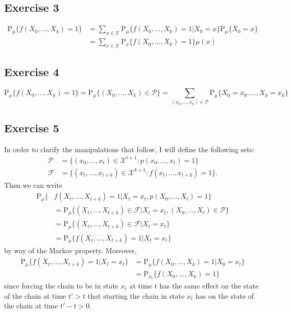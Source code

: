 \documentclass[12pt]{article}
\newcommand{\Prob}{\mathrm{P}}
\begin{document}
\subsection*{Exercise 3}

\begin{align*}
\Prob_\mu \{f(X_0, \ldots, X_k) = 1\} &= \sum_{x \in \mathcal{X}} \Prob_\mu \{f(X_0, \ldots, X_k) = 1 | X_0 = x\} \Prob_\mu \{X_0 = x\} \\
&= \sum_{x \in \mathcal{X}} \Prob_x \{f(X_0, \ldots, X_k) = 1\} \mu(x)
\end{align*}

\subsection*{Exercise 4}

\begin{equation*}
\Prob_\mu \{f(X_0, \ldots, X_k) = 1\} = \Prob_\mu \{(X_0, \ldots, X_k) \in \mathcal{P}\} = \sum_{(x_0, \ldots, x_k) \in \mathcal{P}} \Prob_\mu \{X_0 = x_0, \ldots, X_k = x_k\}
\end{equation*}

\subsection*{Exercise 5}

In order to clarify the manipulations that follow, I will define the following sets:
\begin{align*}
\mathcal{P} &= \{(x_0, \ldots, x_t) \in \mathcal{X}^{t+1} : p(x_0, \ldots, x_t) = 1\} \\
\mathcal{F} &= \{(x_t, \ldots, x_{t+k}) \in \mathcal{X}^{k+1} : f(x_t, \ldots, x_{t+k}) = 1\}.
\end{align*}
Then we can write
\begin{align*}
\Prob_\mu \{&f(X_t, \ldots, X_{t+k}) = 1 | X_t = x_t, p(X_0, \ldots, X_t) = 1\} \\
&= \Prob_\mu \{(X_t, \ldots, X_{t+k}) \in \mathcal{F} | X_t = x_t, (X_0, \ldots, X_t) \in \mathcal{P}\} \\
&= \Prob_\mu \{(X_t, \ldots, X_{t+k}) \in \mathcal{F} | X_t = x_t\} \\
&= \Prob_\mu \{f(X_t, \ldots, X_{t+k}) = 1 | X_t = x_t\}
\end{align*}
by way of the Markov property. Moreover,
\begin{align*}
\Prob_\mu \{f(X_t, \ldots, X_{t+k}) = 1 | X_t = x_t\} &= \Prob_\mu \{f(X_0, \ldots, X_k) = 1 | X_0 = x_t\} \\
&= \Prob_{x_t} \{f(X_0, \ldots, X_k) = 1\}
\end{align*}
since forcing the chain to be in state $x_t$ at time $t$ has the same effect on the state of the chain at time $t' > t$ that starting the chain in state $x_t$ has on the state of the chain at time $t' - t > 0$.
\end{document}
